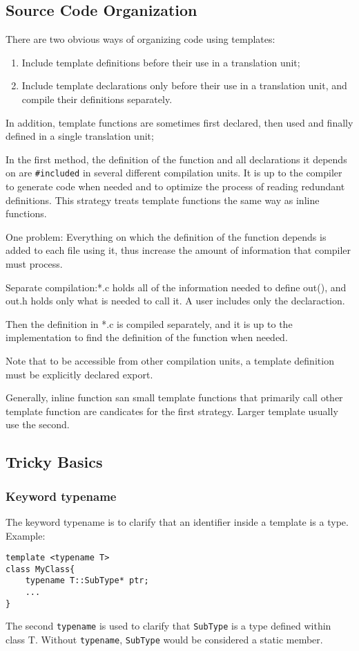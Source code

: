 \documentclass[11pt, a4paper]{book}
\begin{document}
\subsection {Source Code Organization}
There are two obvious ways of organizing code using templates:
\begin{enumerate}
\item Include template definitions before their use in a translation unit;
\item Include template declarations only before their use in a translation unit, and compile their definitions separately.
\end{enumerate} In addition, template functions are sometimes first declared, then used and finally defined in a single translation unit;

In the first method, the definition of the function and all declarations it depends on are \verb|#included| in several different compilation units. It is up to the compiler to generate code when needed and to optimize the process of reading redundant definitions. This strategy treats template functions the same way as inline functions.

One problem: Everything on which the definition of the function depends is added to each file using it, thus increase the amount of information that compiler must process.

Separate compilation:*.c holds all of the information needed to define out(), and out.h holds only what is needed to call it. A user includes only the declaraction.

Then the definition in *.c is compiled separately, and it is up to the implementation to find the definition of the function when needed.

Note that to be accessible from other compilation units, a template definition must be explicitly declared export.

Generally, inline function san small template functions that primarily call other template function are candicates for the first strategy. Larger template usually use the second.
\subsection{Tricky Basics}
\subsubsection{Keyword typename}
The keyword typename is to clarify that an identifier inside a template is a type. Example:
\begin{verbatim}
template <typename T>
class MyClass{
    typename T::SubType* ptr;
    ...
}
\end{verbatim}
The second \verb|typename| is used to clarify that \verb|SubType| is a type defined within class T. Without \verb|typename|, \verb|SubType| would be considered a static member.
\end{document}
